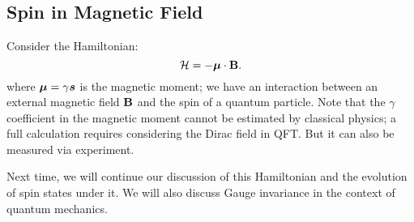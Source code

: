 \subsection{Spin in Magnetic Field}
Consider the Hamiltonian:
\begin{equation}
    \mathcal{H} = -\mbox{\boldmath$ \mu $} \cdot \mathbf{B}.
\end{equation}
where $\mbox{\boldmath$ \mu $} = \gamma \mbox{\boldmath$ s $}$ is the magnetic moment; we have an interaction between an external magnetic field $\mathbf{B}$ and the spin of a quantum particle. Note that the $\gamma$ coefficient in the magnetic moment cannot be estimated by classical physics; a full calculation requires considering the Dirac field in QFT. But it can also be measured via experiment.

Next time, we will continue our discussion of this Hamiltonian and the evolution of spin states under it. We will also discuss Gauge invariance in the context of quantum mechanics.

